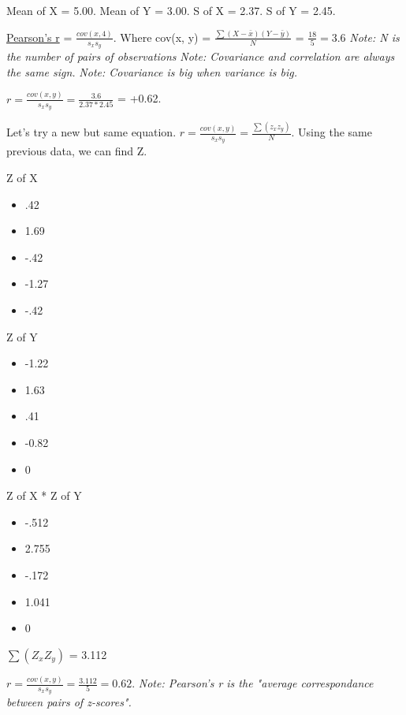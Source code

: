 \documentclass[11pt]{report}
\begin{document}
{\begin{multicols}{5}
    \end{multicols}
    Mean of X = 5.00. \newline
    Mean of Y = 3.00. \newline
    S of X = 2.37. \newline
    S of Y = 2.45. \newline

    \underline{Pearson's r} = $\frac{cov(x, 4)}{s_x s_y}$. \newline 
    Where cov(x, y) = $\frac{\sum(X - \bar{x})(Y - \bar{y})}{N}$ = $\frac{18}{5} = 3.6$ \newline
    \textit{Note: N is the number of pairs of observations} \newline
    \textit{Note: Covariance and correlation are always the same sign.} \newline 
    \textit{Note: Covariance is big when variance is big.} \newline\newline 

    $r = \frac{cov(x, y)}{s_x s_y} = \frac{3.6}{2.37 * 2.45}$ = +0.62. \newline
}

{
    Let's try a new but same equation. $r = \frac{cov(x, y)}{s_x s_y} = \frac{\sum(z_x z_y)}{N}$. \newline
    Using the same previous data, we can find Z. \newline 
    \begin{multicols}{3}
        Z of X
        \begin{itemize}
            \item .42
            \item 1.69
            \item -.42
            \item -1.27
            \item -.42
        \end{itemize}
        \columnbreak
        Z of Y
        \begin{itemize}
            \item -1.22
            \item 1.63
            \item .41
            \item -0.82
            \item 0
        \end{itemize}
        \columnbreak
        Z of X * Z of Y
        \begin{itemize}
            \item -.512
            \item 2.755
            \item -.172
            \item 1.041
            \item 0
        \end{itemize}
        $\sum(Z_x Z_y)$ = 3.112
    \end{multicols}
    $r = \frac{cov(x, y)}{s_x s_y} = \frac{3.112}{5} = 0.62$. \newline
    \textit{Note: Pearson's r is the "average correspondance between pairs of z-scores".}
}
\end{document}
